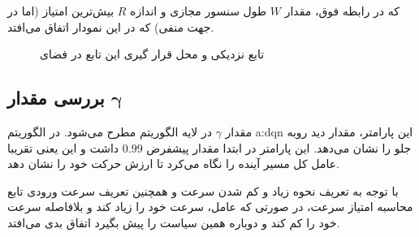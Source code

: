 که در رابطه فوق، مقدار $W$ طول سنسور مجازی و اندازه $R$ بیش‌ترین امتیاز (اما در جهت منفی) که در این نمودار اتفاق می‌افتد.



\begin{figure}
	\centering
\caption{تابع  نزدیکی و محل قرار گیری این تابع در فضای }
\label{fig:agent-nearby}
\end{figure}



\subsection{بررسی مقدار $\mathbf{\gamma}$}

مقدار $\gamma$ در لایه الگوریتم مطرح می‌شود. در الگوریتم \gls{a:dqn} این پارامتر، مقدار دید روبه جلو را نشان ‌می‌دهد.
این پارامتر در ابتدا مقدار پیشفرض $0.99$ داشت و این یعنی تقریبا عامل کل مسیر آینده را نگاه می‌کرد تا ارزش حرکت خود را نشان دهد.

با توجه به تعریف نحوه زیاد و کم شدن سرعت و همچنین تعریف سرعت ورودی تابع محاسبه امتیاز سرعت، در صورتی که عامل، سرعت خود را زیاد کند و بلافاصله سرعت خود را کم کند و دوباره همین سیاست را پیش بگیرد اتفاق بدی می‌افتد.

